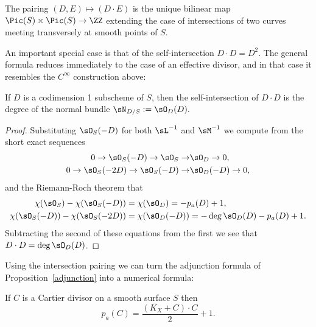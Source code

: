 \begin{theorem} The pairing $(D,E) \mapsto (D\cdot E)$ is the unique bilinear map
$\Pic(S) \times \Pic(S) \to \ZZ$ extending the case of intersections of two curves meeting transversely at smooth points of $S$. 
\end{theorem}

An important special case is that of the self-intersection $D\cdot D = D^2$. The general formula reduces immediately to the case of an effective divisor, and in that case it resembles the $C^{\infty}$ construction above:

\begin{corollary}\label{self-intersection number}
If $D$ is a codimension 1 subscheme of $S$, then the self-intersection of $D\cdot D$ is the degree of the normal bundle
$\sN_{D/S} := \sO_{D}(D).$
\end{corollary}

\begin{proof}
Substituting $\sO_{S}(-D)$ for both $\sL^{-1}$ and $\sM^{-1}$ we compute from the short exact sequences
\begin{align*}
 0\to \sO_{S}(-D)\to \sO_{S}\to &\sO_{D}\to 0,\\
0\to \sO_{S}(-2D)\to \sO_{S}(-D)\to &\sO_{D}(-D)\to 0,
\end{align*}
and the Riemann-Roch theorem that
\begin{align*}
\chi(\sO_{S}) -\chi(\sO_{S}(-D)) &= \chi(\sO_{D}) = -p_{a}(D) +1,\\
\chi(\sO_{S}(-D)) -\chi(\sO_{S}(-2D)) &= \chi(\sO_{D}(-D)) = -\deg \sO_{D}(D) - p_{a}(D) +1.\\
\end{align*}
Subtracting the second of these equations from the first we see that
$D\cdot D = \deg \sO_{D}(D)$.
\end{proof}

Using the intersection pairing we can turn the adjunction formula of Proposition~\ref{adjunction} into a numerical formula:

\begin{theorem}\label{adjunction formula} 
If $C$ is a Cartier divisor on a smooth surface $S$ then\label{genus formula}
$$
p_a(C) = \frac{(K_X+C)\cdot C}{2} +1.
 $$
\end{theorem}


